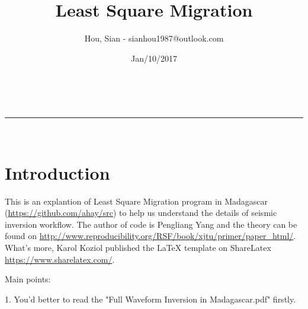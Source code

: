 \documentclass[a4paper,11pt]{article}
\makeatletter
\newcommand{\linia}{\rule{\linewidth}{0.5pt}}
\theoremstyle{mytheor}
\renewcommand{\maketitle}{
\begin{center}
\vspace{2ex}
{\huge \textsc{\@title}}
\vspace{1ex}
\\
\linia\\
\@author \hfill \@date
\vspace{4ex}
\end{center}
}
\makeatother
\begin{document}
\title{Least Square Migration}

\author{Hou, Sian - sianhou1987@outlook.com}

\date{Jan/10/2017}

\maketitle

\section*{Introduction}
This is an explantion of Least Square Migration program in Madagascar (\url{https://github.com/ahay/src}) to help us understand the details of seismic inversion workflow. The author of code is Pengliang Yang and the theory can be found on \url{ http://www.reproducibility.org/RSF/book/xjtu/primer/paper_html/}. What's more, Karol Koziol published the {\LaTeX} template on ShareLatex \url{https://www.sharelatex.com/}.

Main points: 

1. You'd better to read the "Full Waveform Inversion in Madagascar.pdf" firstly.
\end{document}
